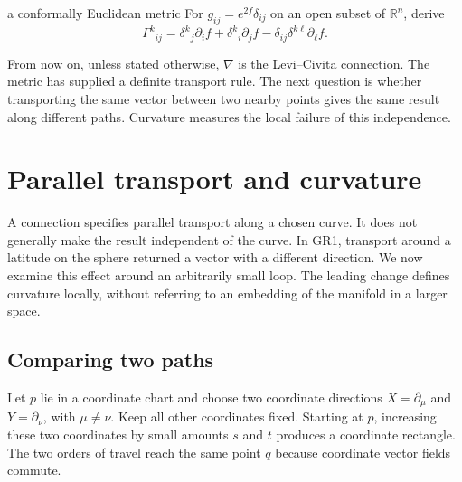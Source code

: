 \documentclass[11pt,a4paper]{article}
\numberwithin{equation}{section}
\newcommand{\R}{\mathbb R}
\newcommand{\slideref}[1]{\par\nobreak\smallskip\nobreak{\footnotesize\color{ink!60}\textsc{Source slide #1}}\par\nobreak\smallskip\nobreak}
\begin{document}
\begin{studentwork}[2.8cm]{a conformally Euclidean metric}
For \(g_{ij}=e^{2f}\delta_{ij}\) on an open subset of \(\R^n\), derive
\[
 \Gamma^k{}_{ij}
 =\delta^k{}_j\partial_i f+\delta^k{}_i\partial_j f
  -\delta_{ij}\delta^{k\ell}\partial_\ell f.
\]
\end{studentwork}

From now on, unless stated otherwise, \(\nabla\) is the Levi--Civita
connection. The metric has supplied a definite transport rule. The next
question is whether transporting the same vector between two nearby
points gives the same result along different paths. Curvature measures
the local failure of this independence.

\section{Parallel transport and curvature}
\label{gr2:sec-curvature}
\slideref{8}

A connection specifies parallel transport along a chosen curve. It does
not generally make the result independent of the curve. In GR1, transport
around a latitude on the sphere returned a vector with a different
direction. We now examine this effect around an arbitrarily small loop.
The leading change defines curvature locally, without referring to an
embedding of the manifold in a larger space.

\subsection{Comparing two paths}

Let \(p\) lie in a coordinate chart and choose two coordinate directions
\(X=\partial_\mu\) and \(Y=\partial_\nu\), with \(\mu\ne\nu\). Keep all
other coordinates fixed. Starting at \(p\), increasing these two
coordinates by small amounts \(s\) and \(t\) produces a coordinate
rectangle. The two orders of travel reach the same point \(q\) because
coordinate vector fields commute.

\begin{center}
\end{center}
\end{document}
